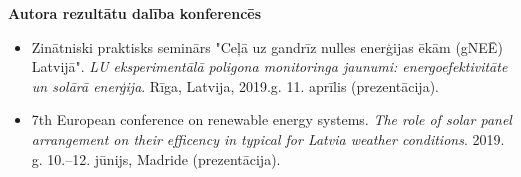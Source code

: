 \textbf{Autora rezultātu dalība konferencēs}
\begin{itemize}
\item Zinātniski praktisks seminārs "Ceļā uz gandrīz nulles enerģijas ēkām (gNEĒ) Latvijā". \emph{LU eksperimentālā poligona monitoringa jaunumi: energoefektivitāte un solārā enerģija}. Rīga, Latvija, 2019.g. 11. aprīlis (prezentācija).
\item 7th European conference on renewable energy systems. \emph{The role of solar panel arrangement on their efficency in typical for Latvia weather conditions}. 2019. g. 10.--12. jūnijs, Madride (prezentācija).
\end{itemize}






